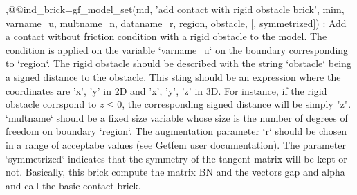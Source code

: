 \begin{cmddescription}
\sep{@@ind_brick=gf_model_set(md, 'add contact with rigid obstacle brick', \tmim mim, \tstr varname_u, \tstr multname_n, \tstr dataname_r, \tint region, \tstr obstacle, [,  \tint symmetrized])} :
Add a contact without friction condition with a rigid obstacle
to the model. The condition is applied on the variable `varname_u`
on the boundary corresponding to `region`. The rigid obstacle should
be described with the string `obstacle` being a signed distance to
the obstacle. This sting should be an expression where the coordinates
are 'x', 'y' in 2D and 'x', 'y', 'z' in 3D. For instance, if the rigid
obstacle corrspond to $z \le 0$, the corresponding signed distance will
be simply "z". `multname` should be a fixed size variable whose size is
the number of degrees of freedom on boundary `region`.
The augmentation parameter `r` should be chosen in a
range of acceptabe values (see Getfem user documentation). The
parameter `symmetrized` indicates that the symmetry of the tangent
matrix will be kept or not. Basically, this brick compute the matrix BN
and the vectors gap and alpha and call the basic contact brick.

\end{cmddescription}
\newpage

